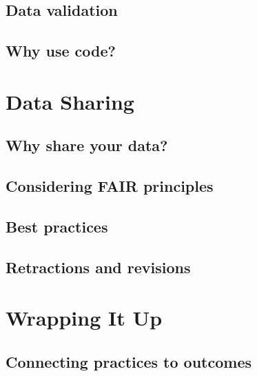 \documentclass[
]{book}
\begin{document}
\hypertarget{data-validation}{%
\section{Data validation}\label{data-validation}}

\hypertarget{why-use-code}{%
\section{Why use code?}\label{why-use-code}}

\hypertarget{data-sharing}{%
\chapter{Data Sharing}\label{data-sharing}}

\hypertarget{why-share-your-data}{%
\section{Why share your data?}\label{why-share-your-data}}

\hypertarget{considering-fair-principles}{%
\section{Considering FAIR principles}\label{considering-fair-principles}}

\hypertarget{best-practices}{%
\section{Best practices}\label{best-practices}}

\hypertarget{retractions-and-revisions}{%
\section{Retractions and revisions}\label{retractions-and-revisions}}

\hypertarget{wrapping-it-up}{%
\chapter{Wrapping It Up}\label{wrapping-it-up}}

\hypertarget{connecting-practices-to-outcomes}{%
\section{Connecting practices to outcomes}\label{connecting-practices-to-outcomes}}
\end{document}
